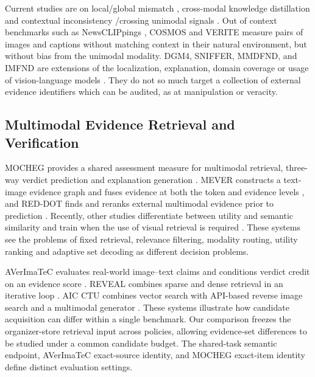 Current studies are on local/global mismatch \cite{wu2023mfir}, cross-modal knowledge distillation \cite{hu2024matching,peng2024contextual} and contextual inconsistency \cite{shang2026semantic}/crossing unimodal signals \cite{wang2024neutralization}. Out of context benchmarks such as NewsCLIPpings \cite{luo2021newsclippings}, COSMOS \cite{aneja2023cosmos} and VERITE \cite{papadopoulos2024verite} measure pairs of images and captions without matching context in their natural environment, but without bias from the unimodal modality. DGM4, SNIFFER, MMDFND, and IMFND are extensions of the localization, explanation, domain coverage or usage of vision-language models \cite{shao2023dgm4,qi2024sniffer,tong2024mmdfnd,jiang2025imfnd}. They do not so much target a collection of external evidence identifiers which can be audited, as at manipulation or veracity.

\subsection{Multimodal Evidence Retrieval and Verification}

MOCHEG provides a shared assessment measure for multimodal retrieval, three-way verdict prediction and explanation generation \cite{yao2023mocheg}. MEVER constructs a text-image evidence graph and fuses evidence at both the token and evidence levels \cite{zhang2026mever}, and RED-DOT finds and reranks external multimodal evidence prior to prediction \cite{papadopoulos2025reddot}. Recently, other studies differentiate between utility and semantic similarity and train when the use of visual retrieval is required \cite{luo2026utility,tsoneva2026selective}. These systems see the problems of fixed retrieval, relevance filtering, modality routing, utility ranking and adaptive set decoding as different decision problems.

AVerImaTeC evaluates real-world image--text claims and conditions verdict credit on an evidence score \cite{cao2026averimatecshared}. REVEAL combines sparse and dense retrieval in an iterative loop \cite{tariq2026reveal}. AIC CTU combines vector search with API-based reverse image search and a multimodal generator \cite{ullrich2026aic}. These systems illustrate how candidate acquisition can differ within a single benchmark. Our comparison freezes the organizer-store retrieval input across policies, allowing evidence-set differences to be studied under a common candidate budget. The shared-task semantic endpoint, AVerImaTeC exact-source identity, and MOCHEG exact-item identity define distinct evaluation settings.

